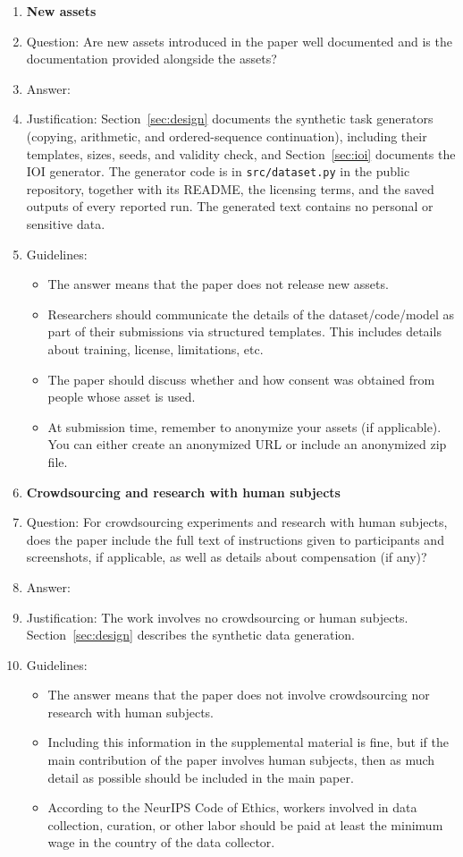 \begin{enumerate}
\item {\bf New assets}
    \item[] Question: Are new assets introduced in the paper well documented and is the documentation provided alongside the assets?
    \item[] Answer: \answerYes{}
    \item[] Justification: Section~\ref{sec:design} documents the synthetic task generators (copying, arithmetic, and ordered-sequence continuation), including their templates, sizes, seeds, and validity check, and Section~\ref{sec:ioi} documents the IOI generator. The generator code is in \texttt{src/dataset.py} in the public repository, together with its README, the licensing terms, and the saved outputs of every reported run. The generated text contains no personal or sensitive data.
    \item[] Guidelines:
    \begin{itemize}
        \item The answer \answerNA{} means that the paper does not release new assets.
        \item Researchers should communicate the details of the dataset\slash code\slash model as part of their submissions via structured templates. This includes details about training, license, limitations, etc. 
        \item The paper should discuss whether and how consent was obtained from people whose asset is used.
        \item At submission time, remember to anonymize your assets (if applicable). You can either create an anonymized URL or include an anonymized zip file.
    \end{itemize}

\item {\bf Crowdsourcing and research with human subjects}
    \item[] Question: For crowdsourcing experiments and research with human subjects, does the paper include the full text of instructions given to participants and screenshots, if applicable, as well as details about compensation (if any)?
    \item[] Answer: \answerNA{}
    \item[] Justification: The work involves no crowdsourcing or human subjects. Section~\ref{sec:design} describes the synthetic data generation.
    \item[] Guidelines:
    \begin{itemize}
        \item The answer \answerNA{} means that the paper does not involve crowdsourcing nor research with human subjects.
        \item Including this information in the supplemental material is fine, but if the main contribution of the paper involves human subjects, then as much detail as possible should be included in the main paper. 
        \item According to the NeurIPS Code of Ethics, workers involved in data collection, curation, or other labor should be paid at least the minimum wage in the country of the data collector. 
    \end{itemize}


\end{enumerate}
